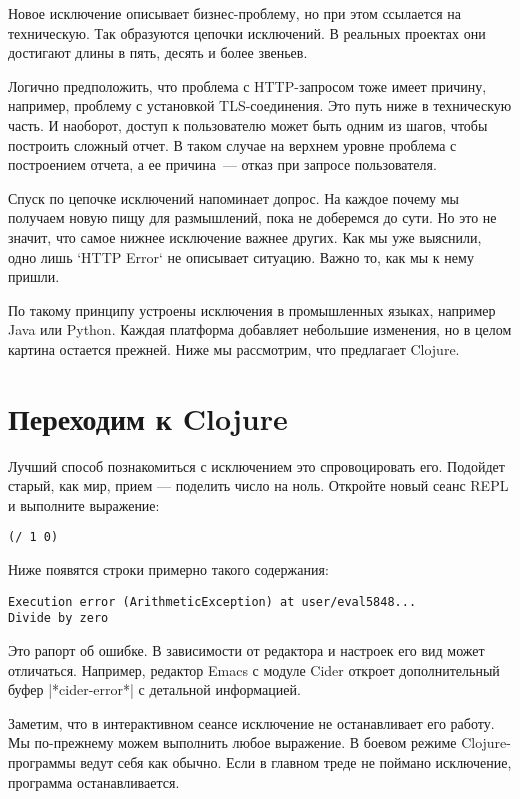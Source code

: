 Новое исключение описывает бизнес-проблему, но при этом ссылается на
техническую. Так образуются цепочки исключений. В реальных проектах они
достигают длины в пять, десять и более звеньев.

Логично предположить, что проблема с HTTP-запросом тоже имеет причину, например,
проблему с установкой TLS-соединения. Это путь ниже в техническую часть. И
наоборот, доступ к пользователю может быть одним из шагов, чтобы построить
сложный отчет. В таком случае на верхнем уровне проблема с построением отчета, а
ее причина~--- отказ при запросе пользователя.

Спуск по цепочке исключений напоминает допрос. На каждое почему мы получаем
новую пищу для размышлений, пока не доберемся до сути. Но это не значит, что
самое нижнее исключение важнее других. Как мы уже выяснили, одно лишь `HTTP
Error` не описывает ситуацию. Важно то, как мы к нему пришли.

По такому принципу устроены исключения в промышленных языках, например Java или
Python. Каждая платформа добавляет небольшие изменения, но в целом картина
остается прежней. Ниже мы рассмотрим, что предлагает Clojure.

\section{Переходим к Clojure}

Лучший способ познакомиться с исключением это спровоцировать его. Подойдет
старый, как мир, прием — поделить число на ноль. Откройте новый сеанс REPL и
выполните выражение:

\begin{verbatim}
(/ 1 0)
\end{verbatim}

Ниже появятся строки примерно такого содержания:

\begin{verbatim}
Execution error (ArithmeticException) at user/eval5848...
Divide by zero
\end{verbatim}

Это рапорт об ошибке. В зависимости от редактора и настроек его вид может
отличаться. Например, редактор Emacs с модуле Cider откроет дополнительный буфер
\spverb|*cider-error*| с детальной информацией.

Заметим, что в интерактивном сеансе исключение не останавливает его работу. Мы
по-прежнему можем выполнить любое выражение. В боевом режиме Clojure-программы
ведут себя как обычно. Если в главном треде не поймано исключение, программа
останавливается.

